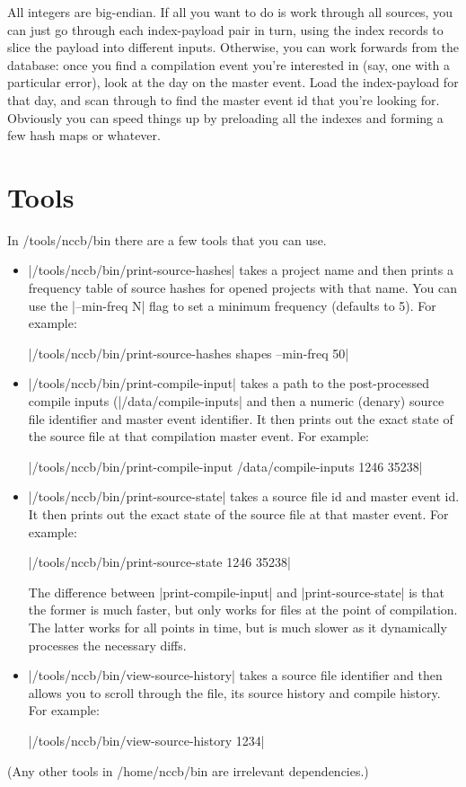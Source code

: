 \documentclass{report}
\begin{document}
All integers are big-endian.  If all you want to do is work
through all sources, you can just go through each index-payload pair
in turn, using the index records to slice the payload into different
inputs.  Otherwise, you can work forwards from the database: once you
find a compilation event you're interested in (say, one with a
particular error), look at the day on the master event.  Load the
index-payload for that day, and scan through to find the master event
id that you're looking for.  Obviously you can speed things up by
preloading all the indexes and forming a few hash maps or whatever.

\section{Tools}
\label{sec:tools}

In /tools/nccb/bin there are a few tools that you can use.

\begin{itemize}
\item |/tools/nccb/bin/print-source-hashes| takes a project name and then prints
a frequency table of source hashes for opened projects with that name.  You can use the
|--min-freq N| flag to set a minimum frequency (defaults to 5).
For example:

|/tools/nccb/bin/print-source-hashes shapes --min-freq 50|

\item |/tools/nccb/bin/print-compile-input| takes a path to the post-processed compile inputs
(|/data/compile-inputs| and then a numeric (denary) source file identifier and master event
identifier.  It then prints out the exact state of the source file at that compilation master
event.  For example:

|/tools/nccb/bin/print-compile-input /data/compile-inputs 1246 35238|

\item |/tools/nccb/bin/print-source-state| takes a source file id and master event id.  It then prints out the exact state of the source file at that master
event.  For example:

|/tools/nccb/bin/print-source-state 1246 35238|

The difference between |print-compile-input| and |print-source-state| is that the former
is much faster, but only works for files at the point of compilation.  The latter works
for all points in time, but is much slower as it dynamically processes the necessary diffs.

\item |/tools/nccb/bin/view-source-history| takes a source file identifier and then
allows you to scroll through the file, its source history and compile history.  For example:

|/tools/nccb/bin/view-source-history 1234|

\end{itemize}
(Any other tools in /home/nccb/bin are irrelevant dependencies.)
\end{document}
